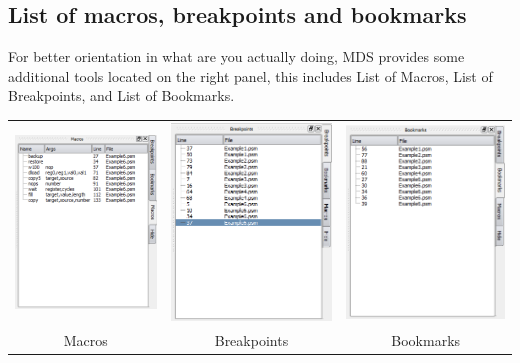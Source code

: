    \clearpage
    \subsection{List of macros, breakpoints and bookmarks}
        For better orientation in what are you actually doing, MDS provides some additional tools located on the right panel, this includes List of Macros, List of Breakpoints, and List of Bookmarks.

        \begin{table}[h!]
            \begin{tabular}{ccc}
                \includegraphics[width=.3\textwidth]{img/listmacros.png}
                    &
                \includegraphics[width=.3\textwidth]{img/listbreakpoints.png}
                    &
                \includegraphics[width=.3\textwidth]{img/listbookmarks.png}
                \\ Macros & Breakpoints & Bookmarks
            \end{tabular}
        \end{table}


